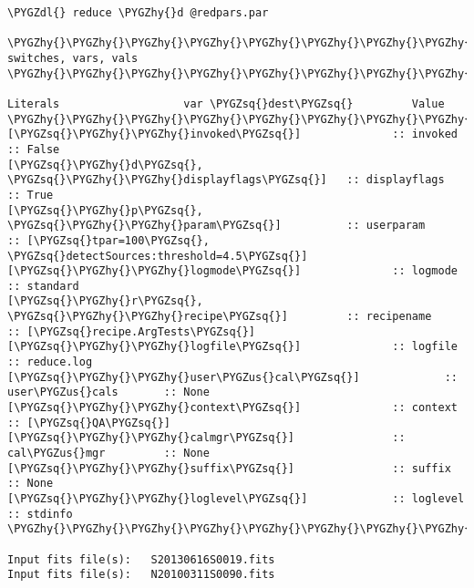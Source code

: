 \documentclass[letterpaper,10pt,english]{sphinxmanual}
\def\PYGZus{\char`\_}
\def\PYGZdl{\char`\$}
\def\PYGZhy{\char`\-}
\def\PYGZsq{\char`\'}
\begin{document}
\begin{Verbatim}[commandchars=\\\{\}]
\PYGZdl{} reduce \PYGZhy{}d @redpars.par

\PYGZhy{}\PYGZhy{}\PYGZhy{}\PYGZhy{}\PYGZhy{}\PYGZhy{}\PYGZhy{}\PYGZhy{}\PYGZhy{}\PYGZhy{}\PYGZhy{}\PYGZhy{}\PYGZhy{}\PYGZhy{}\PYGZhy{}\PYGZhy{}\PYGZhy{}\PYGZhy{}\PYGZhy{}\PYGZhy{}   switches, vars, vals  \PYGZhy{}\PYGZhy{}\PYGZhy{}\PYGZhy{}\PYGZhy{}\PYGZhy{}\PYGZhy{}\PYGZhy{}\PYGZhy{}\PYGZhy{}\PYGZhy{}\PYGZhy{}\PYGZhy{}\PYGZhy{}\PYGZhy{}\PYGZhy{}\PYGZhy{}\PYGZhy{}\PYGZhy{}\PYGZhy{}

Literals                   var \PYGZsq{}dest\PYGZsq{}         Value
\PYGZhy{}\PYGZhy{}\PYGZhy{}\PYGZhy{}\PYGZhy{}\PYGZhy{}\PYGZhy{}\PYGZhy{}\PYGZhy{}\PYGZhy{}\PYGZhy{}\PYGZhy{}\PYGZhy{}\PYGZhy{}\PYGZhy{}\PYGZhy{}\PYGZhy{}\PYGZhy{}\PYGZhy{}\PYGZhy{}\PYGZhy{}\PYGZhy{}\PYGZhy{}\PYGZhy{}\PYGZhy{}\PYGZhy{}\PYGZhy{}\PYGZhy{}\PYGZhy{}\PYGZhy{}\PYGZhy{}\PYGZhy{}\PYGZhy{}\PYGZhy{}\PYGZhy{}\PYGZhy{}\PYGZhy{}\PYGZhy{}\PYGZhy{}\PYGZhy{}\PYGZhy{}\PYGZhy{}\PYGZhy{}\PYGZhy{}\PYGZhy{}\PYGZhy{}\PYGZhy{}\PYGZhy{}\PYGZhy{}\PYGZhy{}\PYGZhy{}\PYGZhy{}\PYGZhy{}\PYGZhy{}\PYGZhy{}\PYGZhy{}\PYGZhy{}\PYGZhy{}\PYGZhy{}\PYGZhy{}\PYGZhy{}\PYGZhy{}\PYGZhy{}\PYGZhy{}\PYGZhy{}
[\PYGZsq{}\PYGZhy{}\PYGZhy{}invoked\PYGZsq{}]              :: invoked         :: False
[\PYGZsq{}\PYGZhy{}d\PYGZsq{}, \PYGZsq{}\PYGZhy{}\PYGZhy{}displayflags\PYGZsq{}]   :: displayflags    :: True
[\PYGZsq{}\PYGZhy{}p\PYGZsq{}, \PYGZsq{}\PYGZhy{}\PYGZhy{}param\PYGZsq{}]          :: userparam       :: [\PYGZsq{}tpar=100\PYGZsq{}, \PYGZsq{}detectSources:threshold=4.5\PYGZsq{}]
[\PYGZsq{}\PYGZhy{}\PYGZhy{}logmode\PYGZsq{}]              :: logmode         :: standard
[\PYGZsq{}\PYGZhy{}r\PYGZsq{}, \PYGZsq{}\PYGZhy{}\PYGZhy{}recipe\PYGZsq{}]         :: recipename      :: [\PYGZsq{}recipe.ArgTests\PYGZsq{}]
[\PYGZsq{}\PYGZhy{}\PYGZhy{}logfile\PYGZsq{}]              :: logfile         :: reduce.log
[\PYGZsq{}\PYGZhy{}\PYGZhy{}user\PYGZus{}cal\PYGZsq{}]             :: user\PYGZus{}cals       :: None
[\PYGZsq{}\PYGZhy{}\PYGZhy{}context\PYGZsq{}]              :: context         :: [\PYGZsq{}QA\PYGZsq{}]
[\PYGZsq{}\PYGZhy{}\PYGZhy{}calmgr\PYGZsq{}]               :: cal\PYGZus{}mgr         :: None
[\PYGZsq{}\PYGZhy{}\PYGZhy{}suffix\PYGZsq{}]               :: suffix          :: None
[\PYGZsq{}\PYGZhy{}\PYGZhy{}loglevel\PYGZsq{}]             :: loglevel        :: stdinfo
\PYGZhy{}\PYGZhy{}\PYGZhy{}\PYGZhy{}\PYGZhy{}\PYGZhy{}\PYGZhy{}\PYGZhy{}\PYGZhy{}\PYGZhy{}\PYGZhy{}\PYGZhy{}\PYGZhy{}\PYGZhy{}\PYGZhy{}\PYGZhy{}\PYGZhy{}\PYGZhy{}\PYGZhy{}\PYGZhy{}\PYGZhy{}\PYGZhy{}\PYGZhy{}\PYGZhy{}\PYGZhy{}\PYGZhy{}\PYGZhy{}\PYGZhy{}\PYGZhy{}\PYGZhy{}\PYGZhy{}\PYGZhy{}\PYGZhy{}\PYGZhy{}\PYGZhy{}\PYGZhy{}\PYGZhy{}\PYGZhy{}\PYGZhy{}\PYGZhy{}\PYGZhy{}\PYGZhy{}\PYGZhy{}\PYGZhy{}\PYGZhy{}\PYGZhy{}\PYGZhy{}\PYGZhy{}\PYGZhy{}\PYGZhy{}\PYGZhy{}\PYGZhy{}\PYGZhy{}\PYGZhy{}\PYGZhy{}\PYGZhy{}\PYGZhy{}\PYGZhy{}\PYGZhy{}\PYGZhy{}\PYGZhy{}\PYGZhy{}\PYGZhy{}\PYGZhy{}\PYGZhy{}

Input fits file(s):   S20130616S0019.fits
Input fits file(s):   N20100311S0090.fits
\end{Verbatim}
\end{document}
